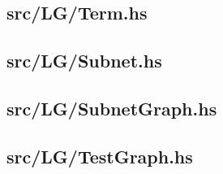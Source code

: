 \documentclass[12pt,a4paper]{article}
\begin{document}
\subsection{src/LG/Term.hs}\label{code:term}

\subsection{src/LG/Subnet.hs}

\subsection{src/LG/SubnetGraph.hs}

\subsection{src/LG/TestGraph.hs}\label{code:test}
\end{document}
